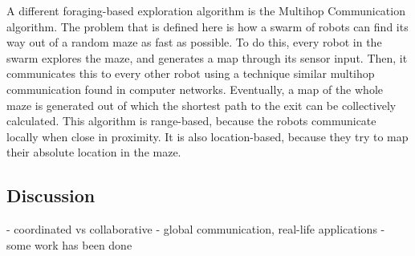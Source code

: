 	A different foraging-based exploration algorithm is the Multihop Communication algorithm. \cite{jung2010multi}
	The problem that is defined here is how a swarm of robots can find its way out of a random maze as fast as possible.
	To do this, every robot in the swarm explores the maze, and generates a map through its sensor input.
	Then, it communicates this to every other robot using a technique similar multihop communication found in computer networks.
	Eventually, a map of the whole maze is generated out of which the shortest path to the exit can be collectively calculated.
	This algorithm is range-based, because the robots communicate locally when close in proximity.
	It is also location-based, because they try to map their absolute location in the maze. 


	
\subsection{Discussion}
\begin{table}[H]
	\renewcommand{\arraystretch}{1.3}
	\label{table_alg_exploration}
	\centering
	\caption{Overview of Common Exploration Algorithms}
\end{table}
	- coordinated vs collaborative
	- global communication, real-life applications
	- some work has been done

